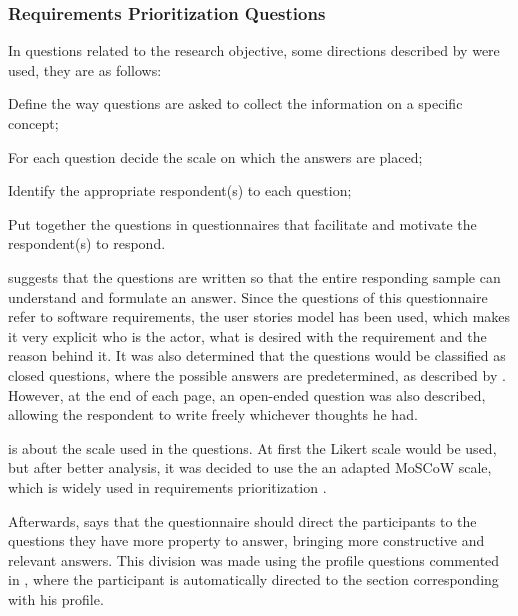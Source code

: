 \subsubsection{Requirements Prioritization Questions}

In questions related to the research objective, some directions described by  were used, they are as follows:
\begin{inparaenum}[(1)]
  \item Define the way questions are asked to collect the information on a
  specific concept;\label{suggestion:1}
  \item For each question decide the scale on which the answers are placed;\label{suggestion:2}
  \item Identify the appropriate respondent(s) to each question;\label{suggestion:3}
  \item Put together the questions in questionnaires that facilitate and motivate the respondent(s) to respond.\label{suggestion:4}
\end{inparaenum}

 suggests that the questions are written so that the entire responding sample can understand and formulate an answer. Since the questions of this questionnaire refer to software requirements, the user stories model has been used, which makes it very explicit who is the actor, what is desired with the requirement and the reason behind it. It was also determined that the questions would be classified as closed questions, where the possible answers are predetermined, as described by . However, at the end of each page, an open-ended question was also described, allowing the respondent to write freely whichever thoughts he had.

 is about the scale used in the questions. At first the Likert scale \cite{joshi2015likert} would be used, but after better analysis, it was decided to use the an adapted \ac{MoSCoW} scale, which is widely used in requirements prioritization \cite{waters2009prioritization}.

Afterwards,  says that the questionnaire should direct the participants to the questions they have more property to answer, bringing more constructive and relevant answers. This division was made using the profile questions commented in , where the participant is automatically directed to the section corresponding with his profile.

